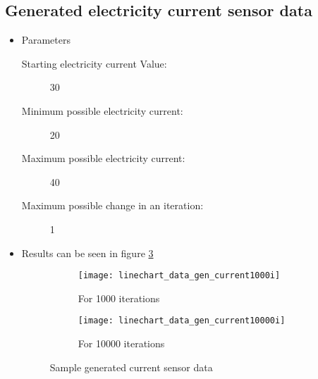                     \subsection{Generated electricity current sensor data}
                        \begin{itemize}
                            \item Parameters
                                \begin{description}
                                    \item[Starting electricity current Value:] 30
                                    \item[Minimum possible electricity current:] 20
                                    \item[Maximum possible electricity current:] 40
                                    \item[Maximum possible change in an iteration:] 1
                                \end{description}
                            \item Results can be seen in figure \ref{fig:gen_current}
                                \begin{figure}
                                    \centering
                                    \captionsetup{type=figure}
                                    \begin{subfigure}[b]{0.45\textwidth}
                                        \centering
                                        \texttt{[image: linechart\_data\_gen\_current1000i]}
                                        \caption{For 1000 iterations}
                                        \label{chart:gen_current_1000}
                                    \end{subfigure}
                                    \hfill
                                    \begin{subfigure}[b]{0.45\textwidth}
                                        \centering
                                        \texttt{[image: linechart\_data\_gen\_current10000i]}
                                        \caption{For 10000 iterations}
                                        \label{chart:gen_current_10000}
                                    \end{subfigure}
                                    
                                    \caption{Sample generated current sensor data }
                                    \label{fig:gen_current}
                            \end{figure}
                        \end{itemize}
        
